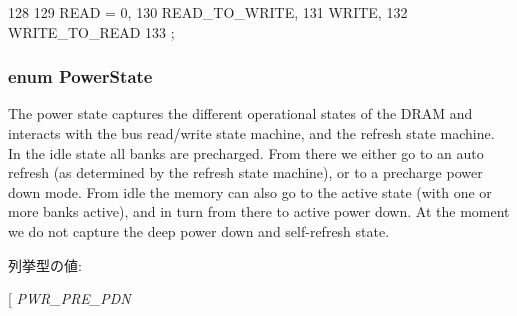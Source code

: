\begin{DoxyCode}
128                   {
129         READ = 0,
130         READ_TO_WRITE,
131         WRITE,
132         WRITE_TO_READ
133     };
\end{DoxyCode}
\hypertarget{classDRAMCtrl_aa59b8ef6374ae587f3c228eba57bdf80}{
\subsubsection[{PowerState}]{\setlength{\rightskip}{0pt plus 5cm}enum {\bf PowerState}}}
\label{classDRAMCtrl_aa59b8ef6374ae587f3c228eba57bdf80}
The power state captures the different operational states of the DRAM and interacts with the bus read/write state machine, and the refresh state machine. In the idle state all banks are precharged. From there we either go to an auto refresh (as determined by the refresh state machine), or to a precharge power down mode. From idle the memory can also go to the active state (with one or more banks active), and in turn from there to active power down. At the moment we do not capture the deep power down and self-\/refresh state. \begin{Desc}
\item[列挙型の値: ]\par
\begin{description}
\item[{\em 
\hypertarget{classDRAMCtrl_aa59b8ef6374ae587f3c228eba57bdf80ada4f1ff35db67e1783712214c08010f2}{
PWR\_\-IDLE}
\label{classDRAMCtrl_aa59b8ef6374ae587f3c228eba57bdf80ada4f1ff35db67e1783712214c08010f2}
}]\item[{\em 
\hypertarget{classDRAMCtrl_aa59b8ef6374ae587f3c228eba57bdf80a96cbccc90bf08cf55fb9ce1fde8fb984}{
PWR\_\-REF}
\label{classDRAMCtrl_aa59b8ef6374ae587f3c228eba57bdf80a96cbccc90bf08cf55fb9ce1fde8fb984}
}]\item[{\em 
\hypertarget{classDRAMCtrl_aa59b8ef6374ae587f3c228eba57bdf80ad70441288ec3dbe4fb80e814a1342f18}{
PWR\_\-PRE\_\-PDN}
\label{classDRAMCtrl_aa59b8ef6374ae587f3c228eba57bdf80ad70441288ec3dbe4fb80e814a1342f18}
}
\end{description}
\end{Desc}

